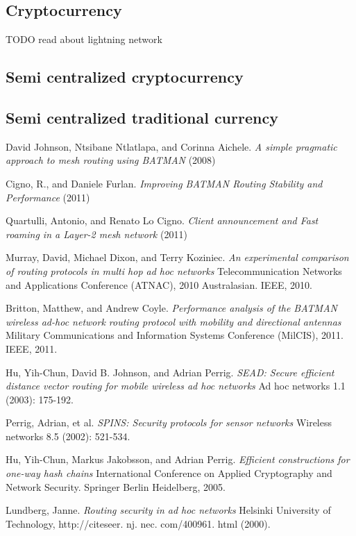 \documentclass[11pt]{article}
\begin{document}
    \subsection{Cryptocurrency}
    
          TODO read about lightning network
    
    \subsection{Semi centralized cryptocurrency}
    \subsection{Semi centralized traditional currency}

\medskip


\begin{thebibliography}{1}



David Johnson, Ntsibane Ntlatlapa, and Corinna Aichele.
\textit{A simple pragmatic approach to mesh routing using BATMAN} (2008)

Cigno, R., and Daniele Furlan.
\textit{Improving BATMAN Routing Stability and Performance} (2011)

Quartulli, Antonio, and Renato Lo Cigno.
\textit{Client announcement and Fast roaming in a Layer-2 mesh network} (2011)

Murray, David, Michael Dixon, and Terry Koziniec.
\textit{An experimental comparison of routing protocols in multi hop ad hoc networks} Telecommunication Networks and Applications Conference (ATNAC), 2010 Australasian. IEEE, 2010.

Britton, Matthew, and Andrew Coyle.
\textit{Performance analysis of the BATMAN wireless ad-hoc network routing protocol with mobility and directional antennas} Military Communications and Information Systems Conference (MilCIS), 2011. IEEE, 2011.

Hu, Yih-Chun, David B. Johnson, and Adrian Perrig. 
\textit{SEAD: Secure efficient distance vector routing for mobile wireless ad hoc networks} Ad hoc networks 1.1 (2003): 175-192.

Perrig, Adrian, et al. 
\textit{SPINS: Security protocols for sensor networks} Wireless networks 8.5 (2002): 521-534.

Hu, Yih-Chun, Markus Jakobsson, and Adrian Perrig. 
\textit{Efficient constructions for one-way hash chains} International Conference on Applied Cryptography and Network Security. Springer Berlin Heidelberg, 2005.

Lundberg, Janne. 
\textit{Routing security in ad hoc networks} Helsinki University of Technology, http://citeseer. nj. nec. com/400961. html (2000).

\end{thebibliography}
\end{document}
